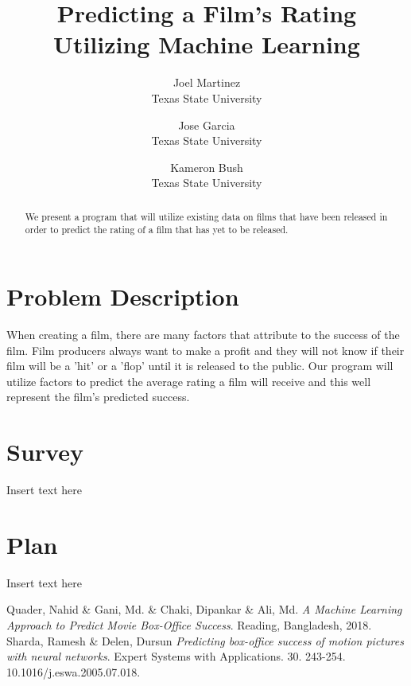 \documentclass[10pt,twocolumn,letterpaper]{article}
\begin{document}
\title{Predicting a Film's Rating Utilizing Machine Learning}

\author{Joel Martinez\\
Texas State University\\
\and
Jose Garcia\\
Texas State University\\
\and
Kameron Bush\\
Texas State University\\
}
\maketitle

\begin{abstract}
   We present a program that will utilize existing data on films that have been released in order to predict the rating of a film that has yet to be released.
\end{abstract}

\section{Problem Description}
	When creating a film, there are many factors that attribute to the success of the film. Film producers always want to make a profit and they will not know if their film will be a 'hit' or a 'flop' until it is released to the public. Our program will utilize factors to predict the average rating a film will receive and this well represent the film's predicted success.

\section{Survey}
	{Insert text here}

\section{Plan}
	{Insert text here}


\begin{thebibliography}{9}
	Quader, Nahid \& Gani, Md. \& Chaki, Dipankar \& Ali, Md. 
	\textit{A Machine Learning Approach to Predict Movie Box-Office Success}. 
	Reading, Bangladesh, 2018.
	Sharda, Ramesh \& Delen, Dursun 
	\textit{Predicting box-office success of motion pictures with neural networks}. 
	Expert Systems with Applications. 30. 243-254. 10.1016/j.eswa.2005.07.018.
\end{thebibliography}
\end{document}
